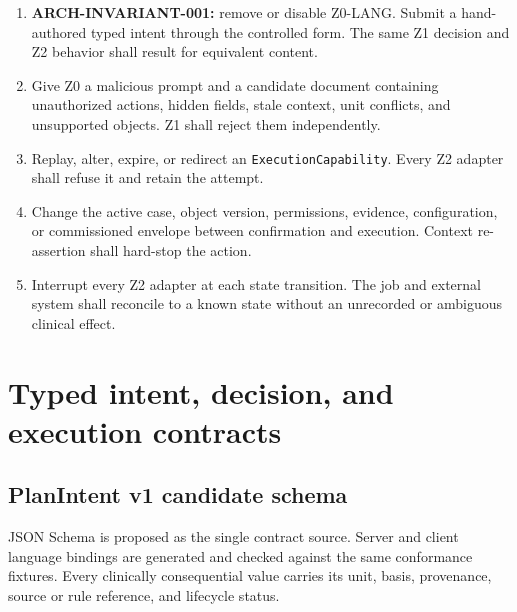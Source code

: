 \documentclass[11pt,letterpaper]{article}
\begin{document}
\begin{enumerate}
\item \textbf{ARCH-INVARIANT-001:} remove or disable Z0-LANG. Submit a hand-authored typed intent through the controlled form. The same Z1 decision and Z2 behavior shall result for equivalent content.
\item Give Z0 a malicious prompt and a candidate document containing unauthorized actions, hidden fields, stale context, unit conflicts, and unsupported objects. Z1 shall reject them independently.
\item Replay, alter, expire, or redirect an \texttt{ExecutionCapability}. Every Z2 adapter shall refuse it and retain the attempt.
\item Change the active case, object version, permissions, evidence, configuration, or commissioned envelope between confirmation and execution. Context re-assertion shall hard-stop the action.
\item Interrupt every Z2 adapter at each state transition. The job and external system shall reconcile to a known state without an unrecorded or ambiguous clinical effect.
\end{enumerate}

\section{Typed intent, decision, and execution contracts}

\subsection{PlanIntent v1 candidate schema}

JSON Schema is proposed as the single contract source. Server and client language bindings are generated and checked against the same conformance fixtures. Every clinically consequential value carries its unit, basis, provenance, source or rule reference, and lifecycle status.
\end{document}
